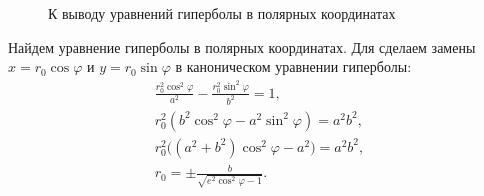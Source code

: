 \begin{wrapfigure}[9]{r}{0.5\tw}
    \caption{К выводу уравнений гиперболы в полярных координатах}
    \label{pic:hyp-polar-coord}    
\end{wrapfigure}
Найдем уравнение гиперболы в полярных координатах. Для сделаем замены $x = r_0 \cos \varphi$ и $y = r_0 \sin \varphi$ в каноническом уравнении гиперболы:
\begin{gather*}
	\frac{r_0^2 \cos^2 \varphi}{a^2} - \frac{r_0^2 \sin^2 \varphi}{b^2} = 1,\\
	r_0^2 ( b^2 \cos^2 \varphi - a^2 \sin^2 \varphi) = a^2 b^2,\\
	r_0^2 \big( (a^2 + b^2) \cos^2 \varphi - a^2 \big) = a^2 b^2,\\
	r_0 = \pm\frac{b}{\sqrt{e^2 \cos^2 \varphi - 1}}.
\end{gather*}

